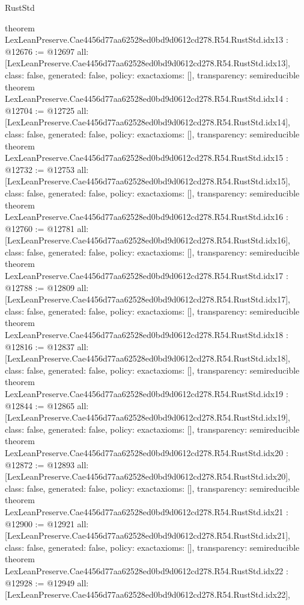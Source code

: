 \begin{lexlean}{RustStd}
\begin{coremodule}
{}
theorem LexLeanPreserve.Cae4456d77aa62528ed0bd9d0612cd278.R54.RustStd.idx13 : @12676 := @12697 {
  all: [LexLeanPreserve.Cae4456d77aa62528ed0bd9d0612cd278.R54.RustStd.idx13],
  class: false,
  generated: false,
  policy: exact{axioms: []},
  transparency: semireducible
}
theorem LexLeanPreserve.Cae4456d77aa62528ed0bd9d0612cd278.R54.RustStd.idx14 : @12704 := @12725 {
  all: [LexLeanPreserve.Cae4456d77aa62528ed0bd9d0612cd278.R54.RustStd.idx14],
  class: false,
  generated: false,
  policy: exact{axioms: []},
  transparency: semireducible
}
theorem LexLeanPreserve.Cae4456d77aa62528ed0bd9d0612cd278.R54.RustStd.idx15 : @12732 := @12753 {
  all: [LexLeanPreserve.Cae4456d77aa62528ed0bd9d0612cd278.R54.RustStd.idx15],
  class: false,
  generated: false,
  policy: exact{axioms: []},
  transparency: semireducible
}
theorem LexLeanPreserve.Cae4456d77aa62528ed0bd9d0612cd278.R54.RustStd.idx16 : @12760 := @12781 {
  all: [LexLeanPreserve.Cae4456d77aa62528ed0bd9d0612cd278.R54.RustStd.idx16],
  class: false,
  generated: false,
  policy: exact{axioms: []},
  transparency: semireducible
}
theorem LexLeanPreserve.Cae4456d77aa62528ed0bd9d0612cd278.R54.RustStd.idx17 : @12788 := @12809 {
  all: [LexLeanPreserve.Cae4456d77aa62528ed0bd9d0612cd278.R54.RustStd.idx17],
  class: false,
  generated: false,
  policy: exact{axioms: []},
  transparency: semireducible
}
theorem LexLeanPreserve.Cae4456d77aa62528ed0bd9d0612cd278.R54.RustStd.idx18 : @12816 := @12837 {
  all: [LexLeanPreserve.Cae4456d77aa62528ed0bd9d0612cd278.R54.RustStd.idx18],
  class: false,
  generated: false,
  policy: exact{axioms: []},
  transparency: semireducible
}
theorem LexLeanPreserve.Cae4456d77aa62528ed0bd9d0612cd278.R54.RustStd.idx19 : @12844 := @12865 {
  all: [LexLeanPreserve.Cae4456d77aa62528ed0bd9d0612cd278.R54.RustStd.idx19],
  class: false,
  generated: false,
  policy: exact{axioms: []},
  transparency: semireducible
}
theorem LexLeanPreserve.Cae4456d77aa62528ed0bd9d0612cd278.R54.RustStd.idx20 : @12872 := @12893 {
  all: [LexLeanPreserve.Cae4456d77aa62528ed0bd9d0612cd278.R54.RustStd.idx20],
  class: false,
  generated: false,
  policy: exact{axioms: []},
  transparency: semireducible
}
theorem LexLeanPreserve.Cae4456d77aa62528ed0bd9d0612cd278.R54.RustStd.idx21 : @12900 := @12921 {
  all: [LexLeanPreserve.Cae4456d77aa62528ed0bd9d0612cd278.R54.RustStd.idx21],
  class: false,
  generated: false,
  policy: exact{axioms: []},
  transparency: semireducible
}
theorem LexLeanPreserve.Cae4456d77aa62528ed0bd9d0612cd278.R54.RustStd.idx22 : @12928 := @12949 {
  all: [LexLeanPreserve.Cae4456d77aa62528ed0bd9d0612cd278.R54.RustStd.idx22],
}
\end{coremodule}
\end{lexlean}
